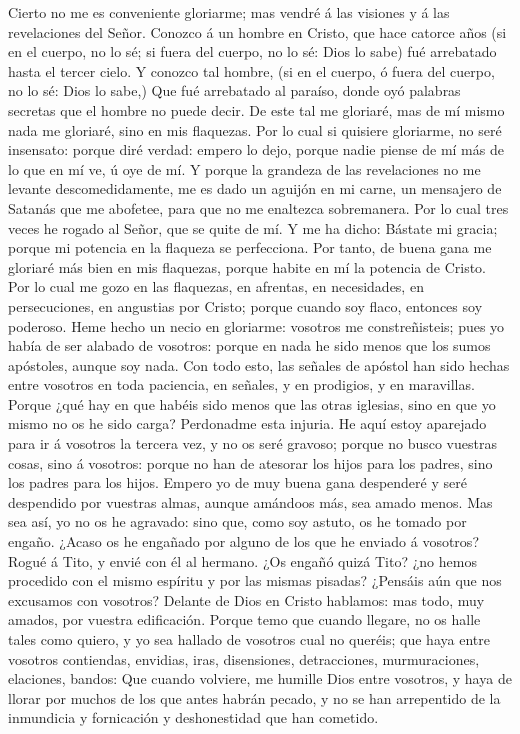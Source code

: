  Cierto no me es conveniente gloriarme; mas vendré á las
visiones y á las revelaciones del Señor.  Conozco á un
hombre en Cristo, que hace catorce años (si en el cuerpo, no lo sé; si
fuera del cuerpo, no lo sé: Dios lo sabe) fué arrebatado hasta el tercer
cielo.  Y conozco tal hombre, (si en el cuerpo, ó fuera
del cuerpo, no lo sé: Dios lo sabe,)  Que fué arrebatado
al paraíso, donde oyó palabras secretas que el hombre no puede decir.
 De este tal me gloriaré, mas de mí mismo nada me
gloriaré, sino en mis flaquezas.  Por lo cual si quisiere
gloriarme, no seré insensato: porque diré verdad: empero lo dejo, porque
nadie piense de mí más de lo que en mí ve, ú oye de mí.  Y
porque la grandeza de las revelaciones no me levante descomedidamente,
me es dado un aguijón en mi carne, un mensajero de Satanás que me
abofetee, para que no me enaltezca sobremanera.  Por lo
cual tres veces he rogado al Señor, que se quite de mí.  Y
me ha dicho: Bástate mi gracia; porque mi potencia en la flaqueza se
perfecciona. Por tanto, de buena gana me gloriaré más bien en mis
flaquezas, porque habite en mí la potencia de Cristo. 
Por lo cual me gozo en las flaquezas, en afrentas, en necesidades, en
persecuciones, en angustias por Cristo; porque cuando soy flaco,
entonces soy poderoso.  Heme hecho un necio en gloriarme:
vosotros me constreñisteis; pues yo había de ser alabado de vosotros:
porque en nada he sido menos que los sumos apóstoles, aunque soy nada.
 Con todo esto, las señales de apóstol han sido hechas
entre vosotros en toda paciencia, en señales, y en prodigios, y en
maravillas.  Porque ¿qué hay en que habéis sido menos que
las otras iglesias, sino en que yo mismo no os he sido carga? Perdonadme
esta injuria.  He aquí estoy aparejado para ir á vosotros
la tercera vez, y no os seré gravoso; porque no busco vuestras cosas,
sino á vosotros: porque no han de atesorar los hijos para los padres,
sino los padres para los hijos.  Empero yo de muy buena
gana despenderé y seré despendido por vuestras almas, aunque amándoos
más, sea amado menos.  Mas sea así, yo no os he agravado:
sino que, como soy astuto, os he tomado por engaño. 
¿Acaso os he engañado por alguno de los que he enviado á vosotros?
 Rogué á Tito, y envié con él al hermano. ¿Os engañó
quizá Tito? ¿no hemos procedido con el mismo espíritu y por las mismas
pisadas?  ¿Pensáis aún que nos excusamos con vosotros?
Delante de Dios en Cristo hablamos: mas todo, muy amados, por vuestra
edificación.  Porque temo que cuando llegare, no os halle
tales como quiero, y yo sea hallado de vosotros cual no queréis; que
haya entre vosotros contiendas, envidias, iras, disensiones,
detracciones, murmuraciones, elaciones, bandos:  Que
cuando volviere, me humille Dios entre vosotros, y haya de llorar por
muchos de los que antes habrán pecado, y no se han arrepentido de la
inmundicia y fornicación y deshonestidad que han cometido.

